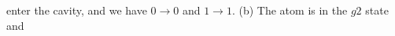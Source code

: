 \hsize=12.7cm
\parindent=0pt
\nopagenumbers
enter the cavity, and we have $0\to 0$ and $1\to 1$. (b) The atom is 
in the $g2$ state and

\bye
